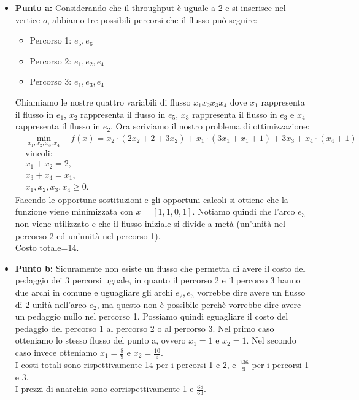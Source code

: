 \documentclass[a4paper,12pt]{article}
\begin{document}
		\begin{itemize}
			\item \textbf{Punto a: }Considerando che il throughput è uguale a 2 e si inserisce nel vertice $o$, abbiamo tre possibili percorsi che il flusso può seguire:
			\begin{itemize}
				\item Percorso 1: $e_5, e_6$
				\item Percorso 2: $e_1, e_2, e_4$
				\item Percorso 3: $e_1, e_3, e_4$
			\end{itemize}
			Chiamiamo le nostre quattro variabili di flusso $x_1x_2x_3x_4$ dove $x_1$ rappresenta il flusso in $e_1$, $x_2$ rappresenta il flusso in $e_5$, $x_3$ rappresenta il flusso in $e_3$ e $x_4$ rappresenta il flusso in $e_2$. Ora scriviamo il nostro problema di ottimizzazione:\\
			\[
			\begin{aligned}
				&\min_{x_1, x_2, x_3, x_4} \quad f(x) = x_2 \cdot (2 x_2 + 2 + 3 x_2) + x_1 \cdot (3 x_1 + x_1 + 1) + 3 x_3 + x_4 \cdot (x_4 + 1) \\
				&\text{vincoli:} \\
				&x_1 + x_2 = 2, \\
				&x_3 + x_4 = x_1, \\
				&x_1,x_2,x_3,x_4 \geq 0.
			\end{aligned}
			\]
			Facendo le opportune sostituzioni e gli opportuni calcoli si ottiene che la funzione viene minimizzata con $x=[1,1,0,1]$. Notiamo quindi che l'arco $e_3$ non viene utilizzato e che il flusso iniziale si divide a metà (un'unità nel percorso 2 ed un'unità nel percorso 1).\\
			Costo totale=14.
			\item \textbf{Punto b: } Sicuramente non esiste un flusso che permetta di avere il costo del pedaggio dei 3 percorsi uguale, in quanto il percorso 2 e il percorso 3 hanno due archi in comune e uguagliare gli archi $e_2,e_3$ vorrebbe dire avere un flusso di 2 unità nell'arco $e_2$, ma questo non è possibile perchè vorrebbe dire avere un pedaggio nullo nel percorso 1. Possiamo quindi eguagliare il costo del pedaggio del percorso 1 al percorso 2 o al percorso 3. Nel primo caso otteniamo lo stesso flusso del punto a, ovvero $x_1=1$ e $x_2=1$. Nel secondo caso invece otteniamo $x_1=\frac{8}{9}$ e $x_2=\frac{10}{9}$.\\
			I costi totali sono rispettivamente 14 per i percorsi 1 e 2, e $\frac{136}{9}$ per i percorsi 1 e 3.\\
			I prezzi di anarchia sono corrispettivamente 1 e $\frac{68}{63}$.
			\end{itemize}
\end{document}
